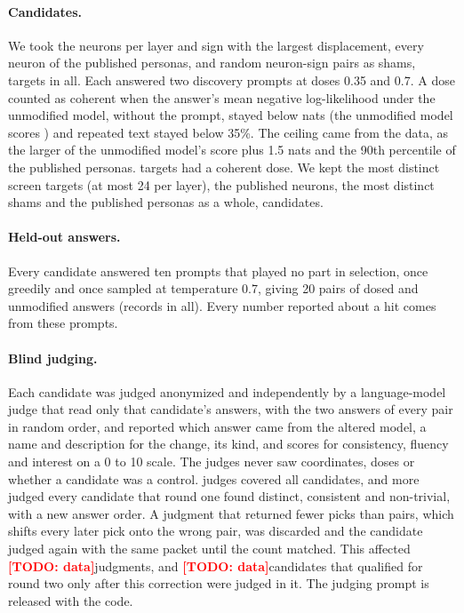 \documentclass[11pt]{article}
\providecommand{\NRejudged}{\todo{data}}\providecommand{\NTopUp}{\todo{data}}
\newcommand{\todo}[1]{\textcolor{red}{\textbf{[TODO: #1]}}}
\begin{document}
\paragraph{Candidates.} We took the \PerLayer neurons per layer and sign with the largest displacement, every neuron
of the published personas, and \NShams random neuron-sign pairs as shams, \NTargets targets in all. Each answered two
discovery prompts at doses 0.35 and 0.7. A dose counted as coherent when the answer's mean negative log-likelihood
under the unmodified model, without the prompt, stayed below \FluencyCeiling nats (the unmodified model scores
\PlainFluency) and repeated text stayed below 35\%. The ceiling came from the data, as the larger of the unmodified
model's score plus 1.5 nats and the 90th percentile of the published personas. \NCoherent targets had a coherent
dose. We kept the \NSurvScreen most distinct screen targets (at most 24 per layer), the \NSurvKnown published
neurons, the \NSurvSham most distinct shams and the \NSurvCatalog published personas as a whole, \NSurvivors
candidates.

\paragraph{Held-out answers.} Every candidate answered ten prompts that played no part in selection, once greedily
and once sampled at temperature 0.7, giving 20 pairs of dosed and unmodified answers (\NStageThree records in all).
Every number reported about a hit comes from these prompts.

\paragraph{Blind judging.} Each candidate was judged anonymized and independently by a language-model judge that
read only that candidate's answers, with the two answers of every pair in random order, and reported which answer came from the
altered model, a name and description for the change, its kind, and scores for consistency, fluency and interest on
a 0 to 10 scale. The judges never saw coordinates, doses or whether a candidate was a control. \NJudgesOne judges
covered all candidates, and \NJudgesTwo more judged every candidate that round one found distinct, consistent and
non-trivial, with a new answer order. A judgment that returned fewer picks than pairs, which shifts every later
pick onto the wrong pair, was discarded and the candidate judged again with the same packet until the count
matched. This affected \NRejudged judgments, and \NTopUp candidates that qualified for round two only after
this correction were judged in it. The judging prompt is released with the code.
\end{document}
